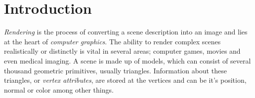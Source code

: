 


\chapter{Introduction}




\textit{Rendering} is the process of converting a scene description into an
image and lies at the heart of \textit{computer graphics}. The ability to render
complex scenes realistically or distinctly is vital in several areas; computer
games, movies and even medical imaging. A scene is made up of models, which can
consist of several thousand geometric primitives, usually triangles. Information
about these triangles, or \textit{vertex attributes}, are stored at the vertices
and can be it's position, normal or color among other things.


